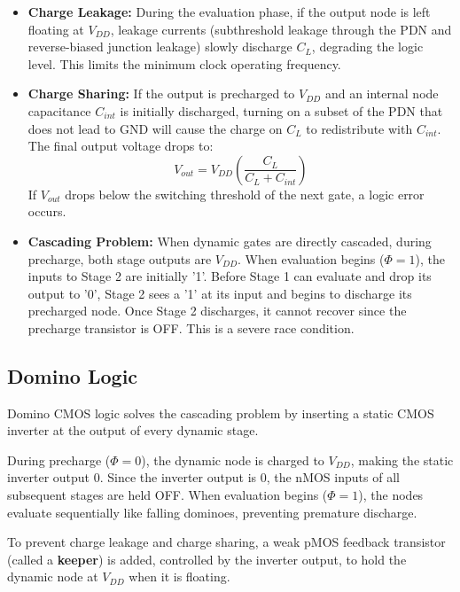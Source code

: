 \documentclass[12pt,a4paper]{article}
\begin{document}
\begin{itemize}[leftmargin=*, itemsep=4pt]
  \item \textbf{Charge Leakage:} During the evaluation phase, if the output node is left floating at $V_{DD}$, leakage currents (subthreshold leakage through the PDN and reverse-biased junction leakage) slowly discharge $C_L$, degrading the logic level. This limits the minimum clock operating frequency.
  \item \textbf{Charge Sharing:}
    If the output is precharged to $V_{DD}$ and an internal node capacitance $C_{int}$ is initially discharged, turning on a subset of the PDN that does not lead to GND will cause the charge on $C_L$ to redistribute with $C_{int}$.
    The final output voltage drops to:
    \begin{equation}
      V_{out} = V_{DD} \left( \frac{C_L}{C_L + C_{int}} \right)
    \end{equation}
    If $V_{out}$ drops below the switching threshold of the next gate, a logic error occurs.
  \item \textbf{Cascading Problem:}
    When dynamic gates are directly cascaded, during precharge, both stage outputs are $V_{DD}$. When evaluation begins ($\Phi = 1$), the inputs to Stage 2 are initially '1'.
    Before Stage 1 can evaluate and drop its output to '0', Stage 2 sees a '1' at its input and begins to discharge its precharged node. Once Stage 2 discharges, it cannot recover since the precharge transistor is OFF. This is a severe race condition.
\end{itemize}

\subsection{Domino Logic}
Domino CMOS logic solves the cascading problem by inserting a static CMOS inverter at the output of every dynamic stage.

\begin{tcolorbox}[defbox, title={\textbf{Domino Logic Mechanism}}]
During precharge ($\Phi = 0$), the dynamic node is charged to $V_{DD}$, making the static inverter output 0. Since the inverter output is 0, the nMOS inputs of all subsequent stages are held OFF. When evaluation begins ($\Phi=1$), the nodes evaluate sequentially like falling dominoes, preventing premature discharge.
\end{tcolorbox}

To prevent charge leakage and charge sharing, a weak pMOS feedback transistor (called a \textbf{keeper}) is added, controlled by the inverter output, to hold the dynamic node at $V_{DD}$ when it is floating.
\end{document}
